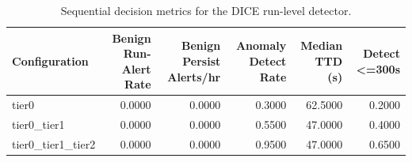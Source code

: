 \begin{table}[t]
\centering
\caption{Sequential decision metrics for the DICE run-level detector.}
\label{tab:dice_sequential_metrics}
\footnotesize
\begin{tabular}{lrrrrr}
\toprule
Configuration & Benign Run-Alert Rate & Benign Persist Alerts/hr & Anomaly Detect Rate & Median TTD (s) & Detect <=300s \\
\midrule
tier0 & 0.0000 & 0.0000 & 0.3000 & 62.5000 & 0.2000 \\
tier0_tier1 & 0.0000 & 0.0000 & 0.5500 & 47.0000 & 0.4000 \\
tier0_tier1_tier2 & 0.0000 & 0.0000 & 0.9500 & 47.0000 & 0.6500 \\
\bottomrule
\end{tabular}

\end{table}
